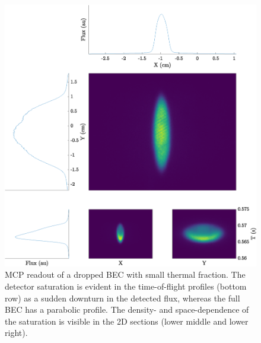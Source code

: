 	

	 \newpage
	 \begin{figure}
	 	\centering
	 	\includegraphics[width=\textwidth]{fig/apparatus/dropped_bec}
	 	\caption{MCP readout of a dropped BEC with small thermal fraction.
	The detector saturation is evident in the time-of-flight profiles (bottom row) as a sudden downturn in the detected flux, whereas the full BEC has a parabolic profile.
	The density- and space-dependence of the saturation is visible in the 2D sections (lower middle and lower right).}
	 	\label{fig:dropped_bec}
	 \end{figure}

